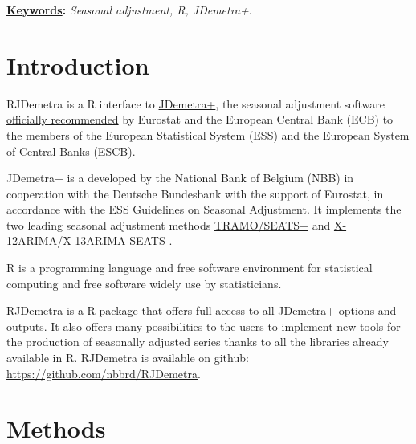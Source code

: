 \documentclass[12pt,a4paper]{article}
\title{
\vspace{-5ex}
\thetitle
\vspace{-2ex}
}
\author{
\theauthors
\vspace{-5ex}
}
\date{}
\def\thekeywords{
\textit{Seasonal adjustment, R, JDemetra+}.
}
\begin{document}
\cfoot{\thepage} %

\sectionfont{\large\textsc}

\maketitle

{\fontsize{10pt}{12.0pt}\selectfont \textbf{\uline{Keywords}:} \thekeywords\par}\par


\section{Introduction}\label{introduction}

RJDemetra is a R interface to
\href{https://github.com/jdemetra/jdemetra-app}{JDemetra+}, the seasonal
adjustment software
\href{https://ec.europa.eu/eurostat/cros/system/files/Jdemetra_\%20release.pdf}{officially
recommended} by Eurostat and the European Central Bank (ECB) to the members of the European Statistical System (ESS) and the European System of Central Banks (ESCB).

JDemetra+ is a developed by the National Bank of Belgium (NBB) in
cooperation with the Deutsche Bundesbank with the support of Eurostat, in accordance with
the ESS Guidelines on Seasonal Adjustment. It implements the two leading seasonal adjustment methods
\href{http://www.bde.es/bde/en/secciones/servicios/Profesionales/Programas_estadi/Programas_estad_d9fa7f3710fd821.html}{TRAMO/SEATS+}  \cite{gomez1998automatic}
and
\href{https://www.census.gov/srd/www/x13as/}{X-12ARIMA/X-13ARIMA-SEATS} \cite{ladiray1999x11}.

R is a programming language and free software environment for
statistical computing and free software widely use by statisticians.

RJDemetra is a R package that offers full access to all JDemetra+ options and
outputs. It also offers many possibilities to the users to implement new tools for the production of seasonally
adjusted series thanks to all the libraries already available in R. RJDemetra is
available on github: \url{https://github.com/nbbrd/RJDemetra}.

\section{Methods}\label{methods}
\end{document}
